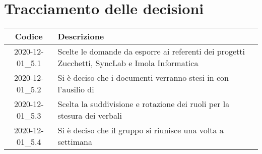 \section*{Tracciamento delle decisioni}

\begin{center}
	\begin{longtable}{|c|p{13cm}|}
		\hline
		\rowcolor{lighter-grayer}
		\textbf{Codice} & \textbf{Descrizione} \\
		\hline
		\endfirsthead

		\hline
		2020-12-01\_5.1 & Scelte le domande da esporre ai referenti dei progetti Zucchetti, SyncLab e Imola Informatica \\
		\hline
		2020-12-01\_5.2 & Si è deciso che i documenti verranno stesi in \glock{\LaTeX} con l'ausilio di \glock{GitHub} \\
		\hline
		2020-12-01\_5.3 & Scelta la suddivisione e rotazione dei ruoli per la stesura dei verbali \\
		\hline
		2020-12-01\_5.4 & Si è deciso che il gruppo si riunisce una volta a settimana \\
		\hline

	\end{longtable}
\end{center}

